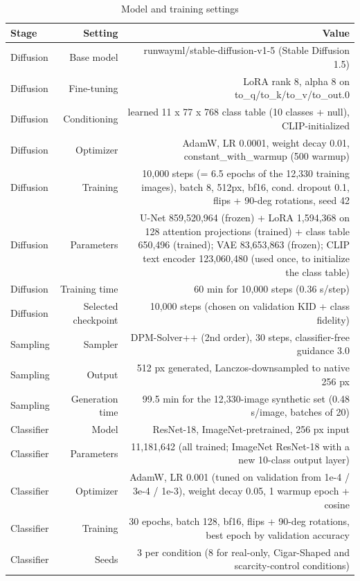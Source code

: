\begin{table}[t]
\centering
\footnotesize
\caption{Model and training settings}
\label{tab:t02_hyperparameters}
\begin{tabular}{lrr}
\toprule
Stage & Setting & Value \\
\midrule
Diffusion & Base model & runwayml/stable-diffusion-v1-5 (Stable Diffusion 1.5) \\
Diffusion & Fine-tuning & LoRA rank 8, alpha 8 on to\_q/to\_k/to\_v/to\_out.0 \\
Diffusion & Conditioning & learned 11 x 77 x 768 class table (10 classes + null), CLIP-initialized \\
Diffusion & Optimizer & AdamW, LR 0.0001, weight decay 0.01, constant\_with\_warmup (500 warmup) \\
Diffusion & Training & 10,000 steps (= 6.5 epochs of the 12,330 training images), batch 8, 512px, bf16, cond. dropout 0.1, flips + 90-deg rotations, seed 42 \\
Diffusion & Parameters & U-Net 859,520,964 (frozen) + LoRA 1,594,368 on 128 attention projections (trained) + class table 650,496 (trained); VAE 83,653,863 (frozen); CLIP text encoder 123,060,480 (used once, to initialize the class table) \\
Diffusion & Training time & 60 min for 10,000 steps (0.36 s/step) \\
Diffusion & Selected checkpoint & 10,000 steps (chosen on validation KID + class fidelity) \\
Sampling & Sampler & DPM-Solver++ (2nd order), 30 steps, classifier-free guidance 3.0 \\
Sampling & Output & 512 px generated, Lanczos-downsampled to native 256 px \\
Sampling & Generation time & 99.5 min for the 12,330-image synthetic set (0.48 s/image, batches of 20) \\
Classifier & Model & ResNet-18, ImageNet-pretrained, 256 px input \\
Classifier & Parameters & 11,181,642 (all trained; ImageNet ResNet-18 with a new 10-class output layer) \\
Classifier & Optimizer & AdamW, LR 0.001 (tuned on validation from 1e-4 / 3e-4 / 1e-3), weight decay 0.05, 1 warmup epoch + cosine \\
Classifier & Training & 30 epochs, batch 128, bf16, flips + 90-deg rotations, best epoch by validation accuracy \\
Classifier & Seeds & 3 per condition (8 for real-only, Cigar-Shaped and scarcity-control conditions) \\

\end{tabular}
\end{table}

